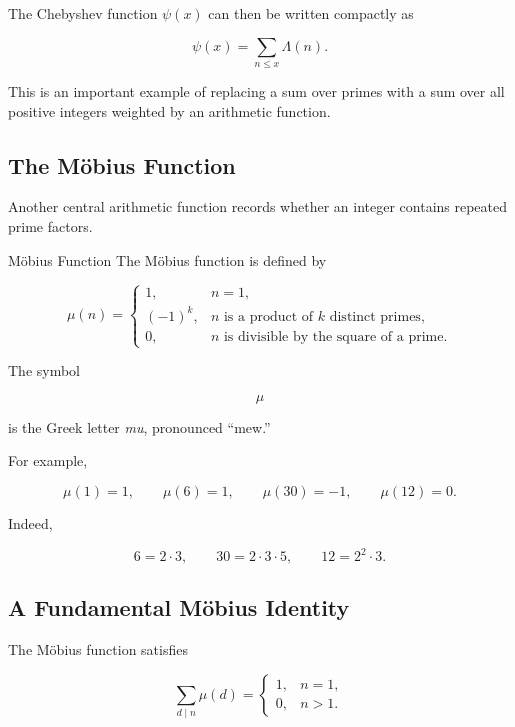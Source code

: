 The Chebyshev function \(\psi(x)\) can then be written compactly as

\[ \boxed{\psi(x)=\sum_{n\leq x}\Lambda(n).} \]

This is an important example of replacing a sum over primes with a sum over
all positive integers weighted by an arithmetic function.

\subsection{The Möbius Function}
\label{subsec:mobius-function}

Another central arithmetic function records whether an integer contains
repeated prime factors.

\begin{definitionbox}{Möbius Function}
The Möbius function is defined by

\[
\mu(n)=
\begin{cases}
1, & n=1,\\
(-1)^k, & n \text{ is a product of }k\text{ distinct primes},\\
0, & n \text{ is divisible by the square of a prime}.
\end{cases}
\]
\end{definitionbox}

The symbol

\[ \mu \]

is the Greek letter \emph{mu}, pronounced ``mew.''

For example,

\[ \mu(1)=1,\qquad\mu(6)=1,\qquad\mu(30)=-1,\qquad\mu(12)=0. \]

Indeed,

\[ 6=2\cdot3,\qquad30=2\cdot3\cdot5,\qquad12=2^2\cdot3. \]

\subsection{A Fundamental Möbius Identity}
\label{subsec:fundamental-mobius-identity}

The Möbius function satisfies

\[
\boxed{
\sum_{d\mid n}\mu(d)=
\begin{cases}
1, & n=1,\\
0, & n>1.
\end{cases}
}
\]


